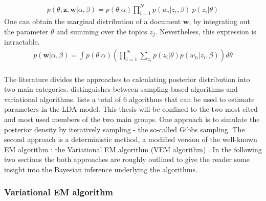 \documentclass[11pt,a4paper]{article}
\begin{document}
\begin{align}\label{joint}
	p(\theta,\textbf{z},\textbf{w}|\alpha,\beta)=p(\theta|\alpha)\prod_{i=1}^{N}p(w_i|z_i,\beta)\ p(z_i|\theta)
\end{align}
One can obtain the marginal distribution of a document $\textbf{w}$, by integrating out the parameter $\theta$ and summing over the topics $z_j$. Nevertheless, this expression is intractable.
\begin{align}\label{marginal}
p(\textbf{w}|\alpha, \beta)=\int p(\theta|\alpha) \left( \prod_{i=1}^{N} \sum_{z_i}p(z_i|\theta)p(w_n|z_i,\beta) \right) d\theta
\end{align}
\ \\
The literature divides the approaches to calculating posterior distribution into two main categories.\cite{Blei2012} distinguishes between sampling based algorithms and variational algorithms. \cite{Powieser2012} lists a total of 6 algorithms that can be used to estimate parameters in the LDA model. This thesis will be confined to the two most cited and most used members of the two main groups. One approach is to simulate the posterior density by iteratively sampling - the so-called Gibbs sampling. The second approach is a deterministic method, a modified version of the well-known EM algorithm \cite{Dempster1977}: the Variational EM algorithm (VEM algorithm) \cite{Wainwright2008}. In the following two sections the both approaches are roughly outlined to give the reader some insight into the Bayesian inference underlying the algorithms.

\subsubsection{Variational EM algorithm}
\end{document}
